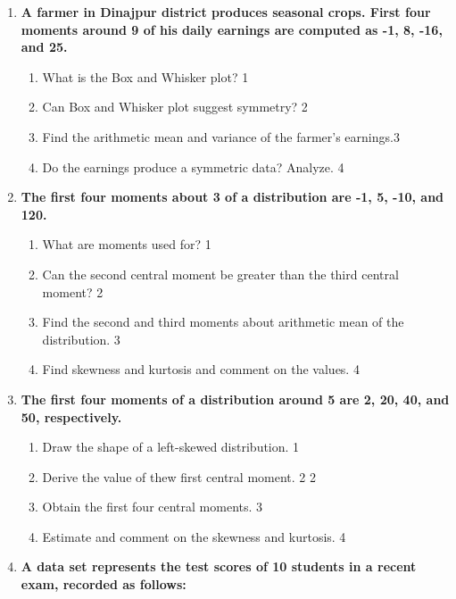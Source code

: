 \documentclass[a4paper,oneside]{book}
\begin{document}
\begin{enumerate}
 \item
	  \textbf{A farmer in Dinajpur district produces seasonal crops. First four moments around 9 of his daily earnings are computed as -1, 8, -16, and 25.}
  
  \begin{enumerate}
    \item
	What is the Box and Whisker plot? \hfill 1
    \item
	Can Box and Whisker plot suggest symmetry? \hfill 2
    \item  
	 Find the arithmetic mean and variance of the farmer's earnings.\hfill 3
    \item
	Do the earnings produce a symmetric data? Analyze. \hfill 4
  \end{enumerate}

 \item
	  \textbf{The first four moments about 3 of a distribution are -1, 5, -10, and 120.} 
  
  \begin{enumerate}
    \item
	What are moments used for? \hfill 1
    \item
	Can the second central moment be greater than the third central moment? \hfill 2
    \item  
	Find the second and third moments about arithmetic mean of the distribution. \hfill 3
    \item
	Find skewness and kurtosis and comment on the values.  \hfill 4
\end{enumerate}

  \item
	  \textbf{The first four moments of a distribution around 5 are 2, 20, 40, and 50, respectively.} 
  
  \begin{enumerate}
	\item 
	Draw the shape of a left-skewed distribution. \hfill 1
	\item 
	Derive the value of thew first central moment. \hfill 2 \hfill 2
    \item
    Obtain the first four central moments. \hfill 3
    \item
	Estimate and comment on the skewness and kurtosis. \hfill 4
  \end{enumerate}
  
  \item
\textbf{A data set represents the test scores of 10 students in a recent exam, recorded as follows:}


\end{enumerate}
\end{document}
